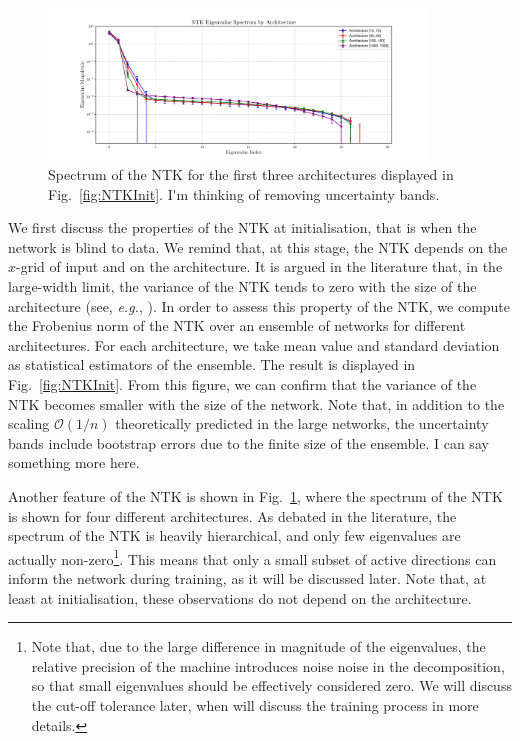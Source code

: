 \begin{figure}[h!]
  \centering
  \includegraphics[width=0.90\textwidth]{plots/ntk_eigenvalue_spectrum.pdf}
  \caption{Spectrum of the NTK for the first three architectures displayed in
  Fig.~\ref{fig:NTKInit}. \ac{I'm thinking of removing uncertainty bands.}}
  \label{fig:NTKSpectrum}
\end{figure}
We first discuss the properties of the NTK at initialisation, that is when the
network is blind to data. We remind that, at this stage, the NTK depends on
the $x$-grid of input and on the architecture. It is argued in the literature
that, in the large-width limit, the variance of the NTK tends to zero with the
size of the architecture (see, \textit{e.g.}, \cite{Roberts:2021fes}). In order
to assess this property of the NTK, we compute the Frobenius norm of the NTK
over an ensemble of networks for different architectures. For each architecture,
we take mean value and standard deviation as statistical estimators of the
ensemble. The result is displayed in Fig.~\ref{fig:NTKInit}. From this figure,
we can confirm that the variance of the NTK becomes smaller with the size of the
network. Note that, in addition to the scaling $\mathcal{O}(1/n)$ theoretically
predicted in the large networks, the uncertainty bands include bootstrap errors
due to the finite size of the ensemble. \ac{I can say something more here.}

Another feature of the NTK is shown in Fig.~\ref{fig:NTKSpectrum}, where the
spectrum of the NTK is shown for four different architectures. As debated in the
literature, the spectrum of the NTK is heavily hierarchical, and only few
eigenvalues are actually non-zero\footnote{Note that, due to the large
difference in magnitude of the eigenvalues, the relative precision of the
machine introduces noise noise in the decomposition, so that small eigenvalues
should be effectively considered zero. We will discuss the cut-off tolerance
later, when will discuss the training process in more details.}. This means that
only a small subset of active directions can inform the network during training,
as it will be discussed later. Note that, at least at initialisation, these
observations do not depend on the architecture.

